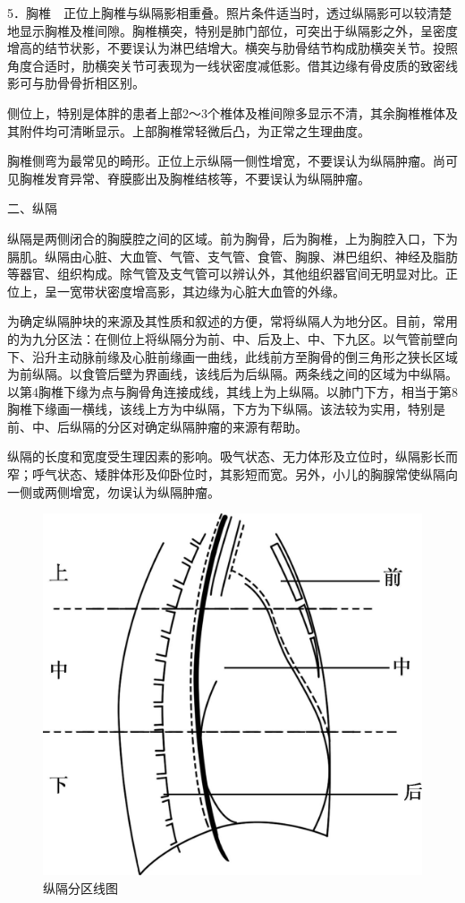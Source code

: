 5．胸椎　正位上胸椎与纵隔影相重叠。照片条件适当时，透过纵隔影可以较清楚地显示胸椎及椎间隙。胸椎横突，特别是肺门部位，可突出于纵隔影之外，呈密度增高的结节状影，不要误认为淋巴结增大。横突与肋骨结节构成肋横突关节。投照角度合适时，肋横突关节可表现为一线状密度减低影。借其边缘有骨皮质的致密线影可与肋骨骨折相区别。

侧位上，特别是体胖的患者上部2～3个椎体及椎间隙多显示不清，其余胸椎椎体及其附件均可清晰显示。上部胸椎常轻微后凸，为正常之生理曲度。

胸椎侧弯为最常见的畸形。正位上示纵隔一侧性增宽，不要误认为纵隔肿瘤。尚可见胸椎发育异常、脊膜膨出及胸椎结核等，不要误认为纵隔肿瘤。

二、纵隔

纵隔是两侧闭合的胸膜腔之间的区域。前为胸骨，后为胸椎，上为胸腔入口，下为膈肌。纵隔由心脏、大血管、气管、支气管、食管、胸腺、淋巴组织、神经及脂肪等器官、组织构成。除气管及支气管可以辨认外，其他组织器官间无明显对比。正位上，呈一宽带状密度增高影，其边缘为心脏大血管的外缘。

为确定纵隔肿块的来源及其性质和叙述的方便，常将纵隔人为地分区。目前，常用的为九分区法：在侧位上将纵隔分为前、中、后及上、中、下九区。以气管前壁向下、沿升主动脉前缘及心脏前缘画一曲线，此线前方至胸骨的倒三角形之狭长区域为前纵隔。以食管后壁为界画线，该线后为后纵隔。两条线之间的区域为中纵隔。以第4胸椎下缘为点与胸骨角连接成线，其线上为上纵隔。以肺门下方，相当于第8胸椎下缘画一横线，该线上方为中纵隔，下方为下纵隔。该法较为实用，特别是前、中、后纵隔的分区对确定纵隔肿瘤的来源有帮助。

纵隔的长度和宽度受生理因素的影响。吸气状态、无力体形及立位时，纵隔影长而窄；呼气状态、矮胖体形及仰卧位时，其影短而宽。另外，小儿的胸腺常使纵隔向一侧或两侧增宽，勿误认为纵隔肿瘤。

\begin{figure}[!htbp]
 \centering
 \includegraphics{./images/Image00133.jpg}
 \captionsetup{justification=centering}
 \caption{纵隔分区线图}
 \label{fig3-1-4}
  \end{figure} 


